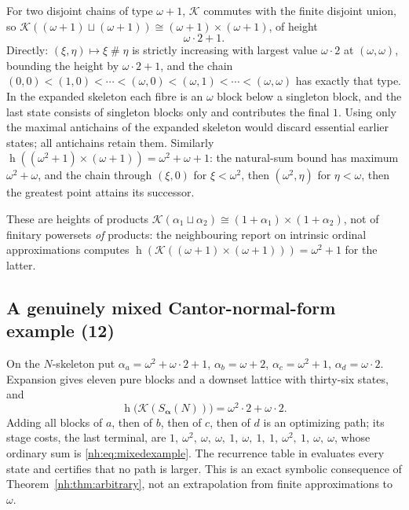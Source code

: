 \documentclass[11pt,a4paper]{article}
\theoremstyle{definition}
\theoremstyle{remark}
\newcommand{\K}{\mathcal K}
\newcommand{\hgt}{\operatorname{h}}
\newcommand{\ns}{\mathbin{\#}}
\begin{document}
For two disjoint chains of type $\omega+1$, $\K$ commutes with the finite
disjoint union, so
$\K((\omega+1)\sqcup(\omega+1))\cong(\omega+1)\times(\omega+1)$, of height
\begin{equation}\label{nh:eq:successorproduct}
 \omega\cdot2+1 .
\end{equation}
Directly: $(\xi,\eta)\mapsto\xi\ns\eta$ is strictly increasing with largest
value $\omega\cdot2$ at $(\omega,\omega)$, bounding the height by
$\omega\cdot2+1$, and the chain
$(0,0)<(1,0)<\cdots<(\omega,0)<(\omega,1)<\cdots<(\omega,\omega)$ has exactly that
type. In the expanded skeleton each fibre is an $\omega$ block below a singleton
block, and the last state consists of singleton blocks only and contributes the
final $1$. Using only the maximal antichains of the expanded skeleton would
discard essential earlier states; all antichains retain them. Similarly
$\hgt((\omega^2+1)\times(\omega+1))=\omega^2+\omega+1$: the natural-sum bound has
maximum $\omega^2+\omega$, and the chain through $(\xi,0)$ for $\xi<\omega^2$,
then $(\omega^2,\eta)$ for $\eta<\omega$, then the greatest point attains its
successor.

These are heights of products $\K(\alpha_1\sqcup\alpha_2)\cong(1+\alpha_1)\times
(1+\alpha_2)$, not of finitary powersets \emph{of} products: the neighbouring
report on intrinsic ordinal approximations computes
$\hgt(\K((\omega+1)\times(\omega+1)))=\omega^2+1$ for the latter.

\subsection{A genuinely mixed Cantor-normal-form example (12)}

On the $N$-skeleton put
$\alpha_a=\omega^2+\omega\cdot2+1$, $\alpha_b=\omega+2$, $\alpha_c=\omega^2+1$,
$\alpha_d=\omega\cdot2$. Expansion gives eleven pure blocks and a downset lattice
with thirty-six states, and
\begin{equation}\label{nh:eq:mixedexample}
 \hgt\bigl(\K(S_{\boldsymbol\alpha}(N))\bigr)=\omega^2\cdot2+\omega\cdot2 .
\end{equation}
Adding all blocks of $a$, then of $b$, then of $c$, then of $d$ is an optimizing
path; its stage costs, the last terminal, are
$1,\ \omega^2,\ \omega,\ \omega,\ 1,\ \omega,\ 1,\ 1,\ \omega^2,\ 1,\ \omega,\ \omega$,
whose ordinary sum is \eqref{nh:eq:mixedexample}. The recurrence table in
 evaluates every state and
certifies that no path is larger. This is an exact symbolic consequence of
Theorem~\ref{nh:thm:arbitrary}, not an extrapolation from finite approximations
to $\omega$.
\end{document}

